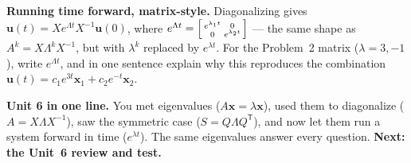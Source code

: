 \documentclass[10pt]{article}
\newcommand{\uu}{\mathbf{u}}
\newcommand{\xx}{\mathbf{x}}
\newcommand{\T}{\mathsf{T}}
\begin{document}
\begin{extensionbox}
\textbf{Running time forward, matrix-style.} Diagonalizing gives $\uu(t)=Xe^{\Lambda t}X^{-1}\uu(0)$, where
$e^{\Lambda t}=\begin{bsmallmatrix}e^{\lambda_1 t}&0\\0&e^{\lambda_2 t}\end{bsmallmatrix}$ --- the same shape as
$A^k=X\Lambda^k X^{-1}$, but with $\lambda^k$ replaced by $e^{\lambda t}$. For the Problem~2 matrix
($\lambda=3,-1$), write $e^{\Lambda t}$, and in one sentence explain why this reproduces the combination
$\uu(t)=c_1e^{3t}\xx_1+c_2e^{-t}\xx_2$. 
\end{extensionbox}

\begin{spiralbox}
\textbf{Unit 6 in one line.} You met eigenvalues ($A\xx=\lambda\xx$), used them to diagonalize
($A=X\Lambda X^{-1}$), saw the symmetric case ($S=Q\Lambda Q^{\T}$), and now let them run a system forward in
time ($e^{\lambda t}$). The same eigenvalues answer every question. \textbf{Next: the Unit~6 review and test.}
\end{spiralbox}
\end{document}
